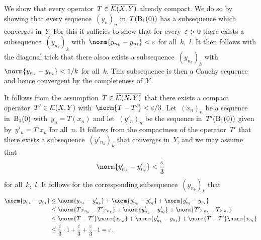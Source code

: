 \section{}





\subsection{}

We show that every operator~$T \in \overline{ \mathcal{K}(X,Y) }$ already compact.
We do so by showing that every sequence~$(y_n)_n$ in~$T(\operatorname{B}_{1}(0))$ has a subsequence which converges in~$Y$.
For this it sufficies to show that for every~$\varepsilon > 0$ there exists a subsequence~$(y_{n_k})_k$ with~$\norm{y_{n_k} - y_{n_l}} < \varepsilon$ for all~$k$,~$l$.
It then follows with the diagonal trick that there alsoa exists a subsequence~$(y_{n_k})_k$ with~$\norm{y_{n_k} - y_{n_l}} < 1/k$ for all~$k$.
This subsequence is then a Cauchy sequence and hence convergent by the completeness of~$Y$.

It follows from the assumption~$T \in \overline{ \mathcal{K}(X,Y) }$ that there exists a compact operator~$T' \in \mathcal{K}(X,Y)$ with~$\norm{T - T'} < \varepsilon / 3$.
Let~$(x_n)_n$ be a sequence in~$\operatorname{B}_{1}(0)$ with~$y_n = T(x_n)$ and let~$(y'_n)_n$ be the sequence in~$T'( \operatorname{B}_{1}(0) )$ given by~$y'_n = T' x_n$ for all~$n$.
It follows from the compactness of the operator~$T'$ that there exists a subsequence~$(y'_{n_k})_k$ that converges in~$Y$, and we may assume that
\[
  \norm{ y'_{n_k} - y'_{n_l} } < \frac{\varepsilon}{3}
\]
for all~$k$,~$l$.
It follows for the corresponding subsequence~$(y_{n_k})_k$ that
\begin{align*}
  \norm{ y_{n_k} - y_{n_l} }
  &\leq
    \norm{ y_{n_k} - y'_{n_k} }
  + \norm{ y'_{n_k} - y'_{n_l} }
  + \norm{ y'_{n_l} - y_{n_l} }
  \\
  &\leq
    \norm{ T x_{n_k} - T' x_{n_k} }
  + \norm{ y'_{n_k} - y'_{n_l} }
  + \norm{ T' x_{n_l} - T x_{n_l} }
  \\
  &\leq
    \norm{T - T'} \norm{x_{n_k}}
  + \norm{ y'_{n_k} - y_{n_l} }
  + \norm{T - T'} \norm{x_{n_l}}
  \\
  &\leq
    \frac{\varepsilon}{3} \cdot 1
  + \frac{\varepsilon}{3}
  + \frac{\varepsilon}{3} \cdot 1
  =
  \varepsilon \,.
\end{align*}





